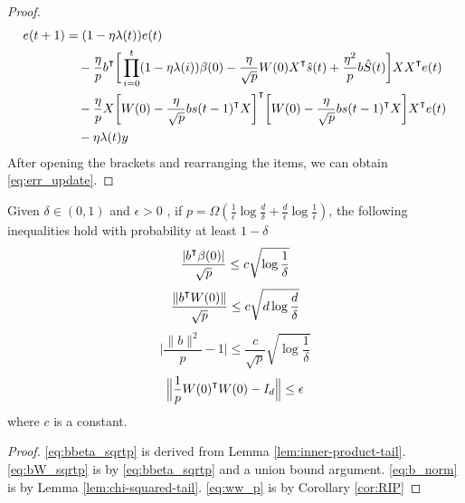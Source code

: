 \begin{proof}
\begin{equation*}
\begin{aligned}
    e(t+1) &= (1-\eta\lambda(t))e(t) \\
    &\quad-\frac{\eta}{p}b\transpose\bigg[ \prod_{i=0}^{t}(1-\eta\lambda(i))\beta(0) -\frac{\eta}{\sqrt p}W(0)X\transpose \hat{s}(t) +\frac{\eta^2}{p}b \hat{S}(t)\bigg]XX\transpose e(t) \\
    &\quad - \frac{\eta}{p}X\bigg[W(0) -\frac{\eta}{\sqrt p}bs(t-1)\transpose X\bigg]\transpose \bigg[W(0) -\frac{\eta}{\sqrt p}bs(t-1)\transpose X\bigg]X\transpose e(t)\\
    &\quad - \eta\lambda(t)y
\end{aligned}
\end{equation*} 
After opening the brackets and rearranging the items, we can obtain \eqref{eq:err_update}.
\end{proof}

\begin{lemma}
\label{lma:ineqs_2}
Given $\delta\in(0,1)$ and $\epsilon>0$ , if $p=\Omega(\frac{1}{\epsilon}\log\frac{d}{\delta}+\frac{d}{\epsilon}\log\frac{1}{\epsilon})$, the following inequalities hold with probability at least $1-\delta$
\begin{equation}
\label{eq:bbeta_sqrtp}
\frac{|b\transpose\beta(0)|}{\sqrt p}\leq c\sqrt{\log\frac{1}{\delta}}
\end{equation}
\begin{equation}
\label{eq:bW_sqrtp}
\frac{\|b\transpose W(0)\|}{\sqrt p}\leq c\sqrt{d\log\frac{d}{\delta}}
\end{equation}
\begin{equation}
\label{eq:b_norm}
\Big|\frac{\|b\|^2}{p}-1\Big| \leq  \frac{c}{\sqrt p}\sqrt {\log \frac{1}{\delta}}
\end{equation}
\begin{equation}
\label{eq:ww_p}
\Big\|\frac{1}{p}W(0)\transpose W(0) - I_d \Big\|\leq \epsilon
\end{equation}
where $c$ is a constant.
\end{lemma}

\begin{proof}
\eqref{eq:bbeta_sqrtp} is derived from Lemma \ref{lem:inner-product-tail}. \eqref{eq:bW_sqrtp} is by \eqref{eq:bbeta_sqrtp} and a union bound argument. \eqref{eq:b_norm} is by Lemma \ref{lem:chi-squared-tail}. \eqref{eq:ww_p} is by Corollary \ref{cor:RIP}
\end{proof}


